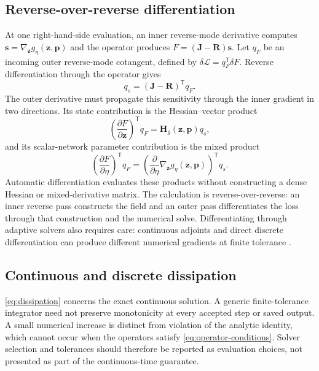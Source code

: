 \documentclass[a4paper,11pt]{article}
\newcommand{\z}{\bm z}
\newcommand{\p}{\bm p}
\newcommand{\s}{\bm s}
\newcommand{\Jop}{\bm J}
\newcommand{\Rop}{\bm R}
\newcommand{\Genergy}{g_{\eta}}
\begin{document}
\subsection{Reverse-over-reverse differentiation}
At one right-hand-side evaluation, an inner reverse-mode derivative computes $\s=\nabla_{\z}\Genergy(\z,\p)$ and the operator produces $F=(\Jop - \Rop)\s$. Let $q_F$ be an incoming outer reverse-mode cotangent, defined by $\delta\mathcal L=q_F^{\mathsf T}\delta F$. Reverse differentiation through the operator gives
\begin{equation}
 q_s=(\Jop - \Rop)^{\mathsf T}q_F.
 \label{eq:gradient-cotangent}
\end{equation}
The outer derivative must propagate this sensitivity through the inner gradient in two directions. Its state contribution is the Hessian--vector product
\begin{equation}
 \left(\frac{\partial F}{\partial\z}\right)^{\mathsf T}q_F=\bm H_g(\z,\p)q_s,
 \label{eq:hvp}
\end{equation}
and its scalar-network parameter contribution is the mixed product
\begin{equation}
 \left(\frac{\partial F}{\partial\eta}\right)^{\mathsf T}q_F=
 \left(\frac{\partial}{\partial\eta}\nabla_{\z}\Genergy(\z,\p)\right)^{\mathsf T}q_s.
 \label{eq:mixed-product}
\end{equation}
Automatic differentiation evaluates these products without constructing a dense Hessian or mixed-derivative matrix. The calculation is reverse-over-reverse: an inner reverse pass constructs the field and an outer pass differentiates the loss through that construction and the numerical solve. 
Differentiating through adaptive solvers also requires care: continuous adjoints and direct discrete differentiation can produce different numerical gradients at finite tolerance \cite{gholami2019anode}.

\subsection{Continuous and discrete dissipation}
\eqref{eq:dissipation} concerns the exact continuous solution. A generic finite-tolerance integrator need not preserve monotonicity at every accepted step or saved output. A small numerical increase is distinct from violation of the analytic identity, which cannot occur when the operators satisfy
\eqref{eq:operator-conditions}. Solver selection and tolerances should therefore be reported as evaluation choices, not presented as part of the continuous-time guarantee.
\end{document}
